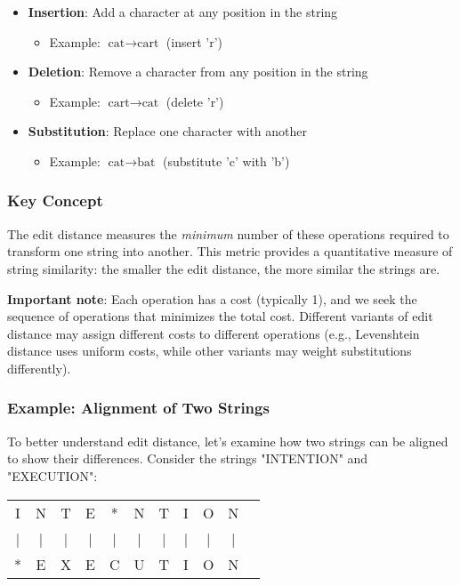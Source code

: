 \documentclass[11pt,a4paper]{article}
\theoremstyle{definition}
\theoremstyle{plain}
\theoremstyle{remark}
\begin{document}
\begin{itemize}
    \item \textbf{Insertion}: Add a character at any position in the string
    \begin{itemize}
        \item Example: $\text{cat} \rightarrow \text{cart}$ (insert 'r')
    \end{itemize}
    
    \item \textbf{Deletion}: Remove a character from any position in the string
    \begin{itemize}
        \item Example: $\text{cart} \rightarrow \text{cat}$ (delete 'r')
    \end{itemize}
    
    \item \textbf{Substitution}: Replace one character with another
    \begin{itemize}
        \item Example: $\text{cat} \rightarrow \text{bat}$ (substitute 'c' with 'b')
    \end{itemize}
\end{itemize}

\subsubsection{Key Concept}
The edit distance measures the \textit{minimum} number of these operations required to transform one string into another. This metric provides a quantitative measure of string similarity: the smaller the edit distance, the more similar the strings are.

\textbf{Important note}: Each operation has a cost (typically 1), and we seek the sequence of operations that minimizes the total cost. Different variants of edit distance may assign different costs to different operations (e.g., Levenshtein distance uses uniform costs, while other variants may weight substitutions differently).

\subsubsection{Example: Alignment of Two Strings}

To better understand edit distance, let's examine how two strings can be aligned to show their differences. Consider the strings "INTENTION" and "EXECUTION":

\begin{center}
\begin{tabular}{ccccccccccc}
I & N & T & E & * & N & T & I & O & N \\
| & | & | & | & | & | & | & | & | & | \\
* & E & X & E & C & U & T & I & O & N \\
\end{tabular}
\end{center}
\end{document}
